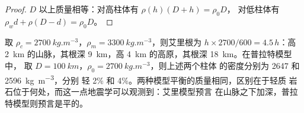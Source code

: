 \begin{proof}
$D$ 以上质量相等：对高柱体有 $\rho(h)(D + h) = \rho_0 D$，
对低柱体有 $\rho_w d + \rho(D - d) = \rho_0 D$。
\end{proof}

取 $\rho_c = \qty{2700}{kg.m^{-3}}$，$\rho_m = \qty{3300}{kg.m^{-3}}$，则艾里根为
$h\times2700/600 = 4.5\,h$：高 \qty{2}{km} 的山脉，其根深
\qty{9}{km}，高 \qty{4}{km} 的高原，其根深 \qty{18}{km}。在普拉特模型中，
取 $D = \qty{100}{km}$，$\rho_0 = \qty{2700}{kg.m^{-3}}$，则上述两个柱体
的密度分别为 2647 和 \qty{2596}{kg.m^{-3}}，分别
轻 2\% 和 4\%。两种模型平衡的质量相同，区别在于轻质
岩石位于何处，而这一点地震学可以观测到：艾里模型预言
在山脉之下加深，普拉特模型则预言是平的。

